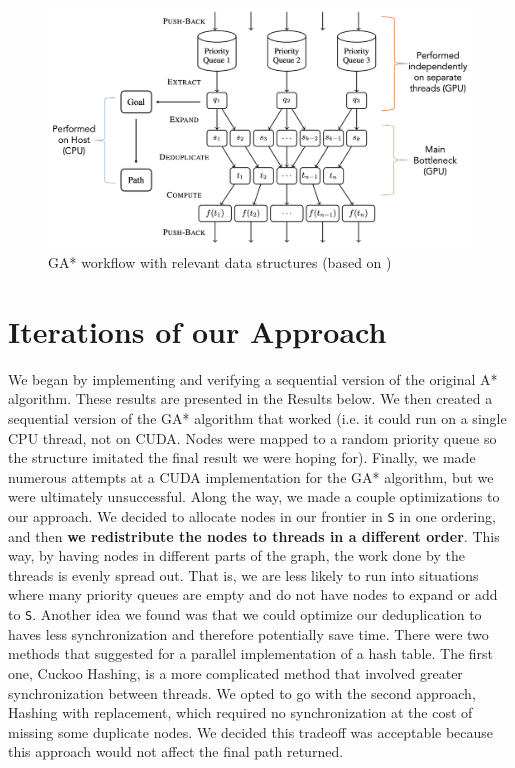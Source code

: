 \begin{figure}
    \centering
    \includegraphics[scale=0.5]{figures/gastar_device.png}
    \caption{GA* workflow with relevant data structures (based on \cite{paper})}
    \label{fig:gastar_device}
\end{figure}

\section{Iterations of our Approach}
We began by implementing and verifying a sequential version of the original A* algorithm. These results are presented in the Results below. We then created a sequential version of the GA* algorithm that worked (i.e. it could run on a single CPU thread, not on CUDA. Nodes were mapped to a random priority queue so the structure imitated the final result we were hoping for). Finally, we made numerous attempts at a CUDA implementation for the GA* algorithm, but we were ultimately unsuccessful.\newline\newline
Along the way, we made a couple optimizations to our approach. We decided to allocate nodes in our frontier in \verb|S| in one ordering, and then \textbf{we redistribute the nodes to threads in a different order}. This way, by having nodes in different parts of the graph, the work done by the threads is evenly spread out. That is, we are less likely to run into situations where many priority queues are empty and do not have nodes to expand or add to \verb|S|.\newline\newline
Another idea we found was that we could optimize our deduplication to haves less synchronization and therefore potentially save time. There were two methods that \cite{paper} suggested for a parallel implementation of a hash table. The first one, Cuckoo Hashing, is a more complicated method that involved greater synchronization between threads. We opted to go with the second approach, Hashing with replacement, which required no synchronization at the cost of missing some duplicate nodes. We decided this tradeoff was acceptable because this approach would not affect the final path returned.